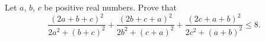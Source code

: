Let $ a$,  $ b$,  $ c$ be positive real numbers. Prove that\[ \dfrac{(2a + b + c)^2}{2a^2 + (b + c)^2} + \dfrac{(2b + c + a)^2}{2b^2 + (c + a)^2} + \dfrac{(2c + a + b)^2}{2c^2 + (a + b)^2} \le 8.

\]
